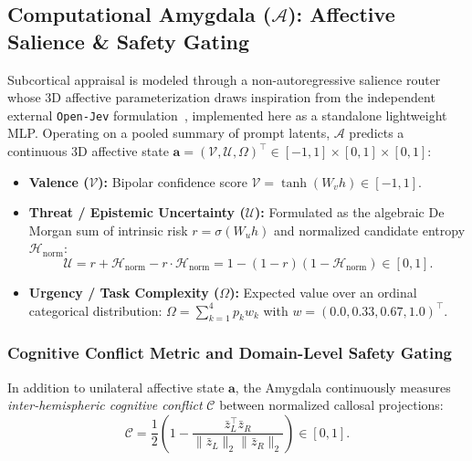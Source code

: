 \documentclass[11pt,a4paper]{article}
\theoremstyle{plain}
\theoremstyle{definition}
\theoremstyle{remark}
\newcommand{\AM}{\mathcal{A}}
\begin{document}
\subsection{Computational Amygdala ($\AM$): Affective Salience \& Safety Gating}

Subcortical appraisal is modeled through a non-autoregressive salience router whose 3D affective parameterization draws inspiration from the independent external \texttt{Open-Jev} formulation~\cite{cai2025openjev}, implemented here as a standalone lightweight MLP. Operating on a pooled summary of prompt latents, $\AM$ predicts a continuous 3D affective state $\mathbf{a} = (\mathcal{V}, \mathcal{U}, \Omega)^\top \in [-1, 1] \times [0, 1] \times [0, 1]$:
\begin{itemize}
    \item \textbf{Valence ($\mathcal{V}$):} Bipolar confidence score $\mathcal{V} = \tanh(W_v h) \in [-1, 1]$.
    \item \textbf{Threat / Epistemic Uncertainty ($\mathcal{U}$):} Formulated as the algebraic De Morgan sum of intrinsic risk $r = \sigma(W_u h)$ and normalized candidate entropy $\mathcal{H}_{\mathrm{norm}}$:
    \begin{equation}
        \mathcal{U} = r + \mathcal{H}_{\mathrm{norm}} - r \cdot \mathcal{H}_{\mathrm{norm}} = 1 - (1 - r)(1 - \mathcal{H}_{\mathrm{norm}}) \in [0, 1].
    \end{equation}
    \item \textbf{Urgency / Task Complexity ($\Omega$):} Expected value over an ordinal categorical distribution: $\Omega = \sum_{k=1}^4 p_k w_k$ with $w = (0.0, 0.33, 0.67, 1.0)^\top$.
\end{itemize}

\subsubsection{Cognitive Conflict Metric and Domain-Level Safety Gating}

In addition to unilateral affective state $\mathbf{a}$, the Amygdala continuously measures \emph{inter-hemispheric cognitive conflict} $\mathcal{C}$ between normalized callosal projections:
\begin{equation}
    \mathcal{C} = \frac{1}{2}\left( 1 - \frac{\bar{z}_L^\top \bar{z}_R}{\|\bar{z}_L\|_2 \|\bar{z}_R\|_2} \right) \in [0, 1].
\end{equation}
\end{document}
